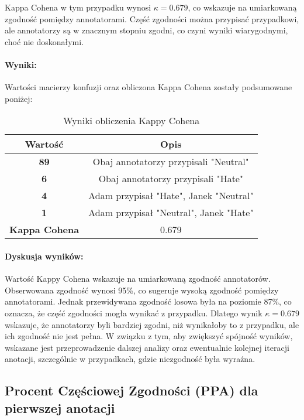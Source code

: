 \documentclass[12pt]{article}
\begin{document}
Kappa Cohena w tym przypadku wynosi \( \kappa = 0.679 \), co wskazuje na umiarkowaną zgodność pomiędzy annotatorami. Część zgodności można przypisać przypadkowi, ale annotatorzy są w znacznym stopniu zgodni, co czyni wyniki wiarygodnymi, choć nie doskonałymi.

\paragraph{Wyniki:}
Wartości macierzy konfuzji oraz obliczona Kappa Cohena zostały podsumowane poniżej:

\begin{table}[h!]
\centering
\begin{tabular}{|c|c|}
\hline
\textbf{Wartość}      & \textbf{Opis}                        \\ \hline
\textbf{89}           & Obaj annotatorzy przypisali "Neutral" \\ \hline
\textbf{6}            & Obaj annotatorzy przypisali "Hate"    \\ \hline
\textbf{4}            & Adam przypisał "Hate", Janek "Neutral" \\ \hline
\textbf{1}            & Adam przypisał "Neutral", Janek "Hate" \\ \hline
\textbf{Kappa Cohena} & 0.679                                 \\ \hline
\end{tabular}
\caption{Wyniki obliczenia Kappy Cohena}
\end{table}

\paragraph{Dyskusja wyników:}
Wartość Kappy Cohena wskazuje na umiarkowaną zgodność annotatorów. Obserwowana zgodność wynosi 95\%, co sugeruje wysoką zgodność pomiędzy annotatorami. Jednak przewidywana zgodność losowa była na poziomie 87\%, co oznacza, że część zgodności mogła wynikać z przypadku. Dlatego wynik \( \kappa = 0.679 \) wskazuje, że annotatorzy byli bardziej zgodni, niż wynikałoby to z przypadku, ale ich zgodność nie jest pełna. W związku z tym, aby zwiększyć spójność wyników, wskazane jest przeprowadzenie dalszej analizy oraz ewentualnie kolejnej iteracji anotacji, szczególnie w przypadkach, gdzie niezgodność była wyraźna.



\subsection{Procent Częściowej Zgodności (PPA) dla pierwszej anotacji}
\end{document}
